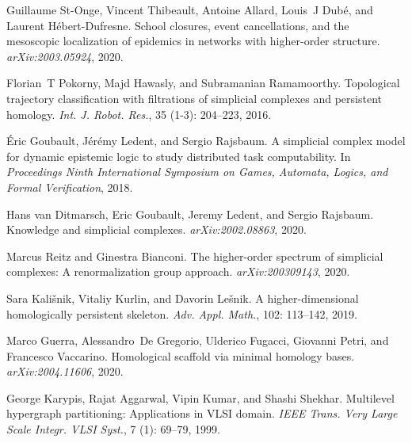 Guillaume St-Onge, Vincent Thibeault, Antoine Allard, Louis~J Dub{\'e}, and
Laurent H{\'e}bert-Dufresne.
\newblock School closures, event cancellations, and the mesoscopic localization
of epidemics in networks with higher-order structure.
\newblock \emph{arXiv:2003.05924}, 2020.

Florian~T Pokorny, Majd Hawasly, and Subramanian Ramamoorthy.
\newblock Topological trajectory classification with filtrations of simplicial
complexes and persistent homology.
\newblock \emph{Int. J. Robot. Res.}, 35 (1-3): 204--223,
2016.

{\'E}ric Goubault, J{\'e}r{\'e}my Ledent, and Sergio Rajsbaum.
\newblock A simplicial complex model for dynamic epistemic logic to study
distributed task computability.
\newblock In \emph{Proceedings Ninth International Symposium on Games,
    Automata, Logics, and Formal Verification}, 2018.

Hans {van Ditmarsch}, Eric Goubault, Jeremy Ledent, and Sergio Rajsbaum.
\newblock Knowledge and simplicial complexes.
\newblock \emph{arXiv:2002.08863}, 2020.

Marcus Reitz and Ginestra Bianconi.
\newblock The higher-order spectrum of simplicial complexes: A renormalization
group approach.
\newblock \emph{arXiv:200309143}, 2020.

Sara Kali{\v s}nik, Vitaliy Kurlin, and Davorin Le{\v s}nik.
\newblock A higher-dimensional homologically persistent skeleton.
\newblock \emph{Adv. Appl. Math.}, 102: 113--142, 2019.

Marco Guerra, Alessandro~De Gregorio, Ulderico Fugacci, Giovanni Petri, and
Francesco Vaccarino.
\newblock Homological scaffold via minimal homology bases.
\newblock \emph{arXiv:2004.11606}, 2020.

George Karypis, Rajat Aggarwal, Vipin Kumar, and Shashi Shekhar.
\newblock Multilevel hypergraph partitioning: Applications in {{VLSI}} domain.
\newblock \emph{IEEE Trans. Very Large Scale Integr. VLSI Syst.}, 7
(1): 69--79, 1999.

